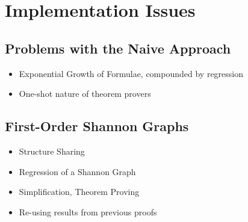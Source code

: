 \chapter{Implementation Issues}\label{ch:implementation}
\minitoc
\onehalfspace   %

\section{Problems with the Naive Approach}

\begin{itemize}
\item Exponential Growth of Formulae, compounded by regression
\item One-shot nature of theorem provers
\end{itemize}

\section{First-Order Shannon Graphs}

\begin{itemize}
\item Structure Sharing
\item Regression of a Shannon Graph
\item Simplification, Theorem Proving
\item Re-using results from previous proofs
\end{itemize}


